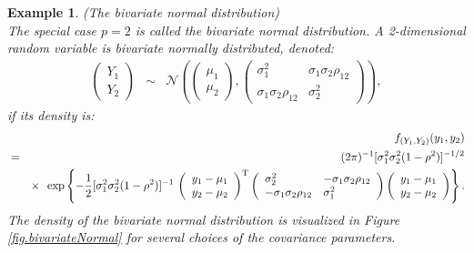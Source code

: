 \documentclass[a4paper]{article}
\theoremstyle{myexamplestyle}
\newtheorem{example}{Example}
\begin{document}
\begin{example} \textit{(The bivariate normal distribution)}
\\
The special case $p=2$ is called the bivariate normal distribution. A 2-dimensional random variable is bivariate normally distributed, denoted:
\begin{eqnarray*}
\left(
\begin{array}{l}
Y_{1}
\\
Y_{2}
\end{array}
\right)
& \sim &
\mathcal{N} \left(
\left(
\begin{array}{l}
\mu_{1}
\\
\mu_{2}
\end{array}
\right),
\left(
\begin{array}{ll}
\sigma_{1}^{2} & \sigma_1 \sigma_2 \rho_{12}
\\
\sigma_1 \sigma_2 \rho_{12} & \sigma_{2}^{2}
\end{array}
\right)
\right),
\end{eqnarray*}
if its density is:
\begin{eqnarray*}
& & \hspace{-1cm} f_{(Y_1, Y_2)} (y_1, y_2) 
\\
& = &
(2 \pi)^{-1} [\sigma_1^2 \sigma_2^2 (1-\rho^2)]^{-1/2} 
\\
& & \times \, \, \, \exp \left\{ -\frac{1}{2}
[\sigma_1^2 \sigma_2^2 (1-\rho^2)]^{-1}
\, 
\left(
\begin{array}{l}
y_{1} - \mu_1
\\
y_{2} - \mu_2
\end{array}
\right)^{\mathrm{T}} 
\left(
\begin{array}{ll}
\sigma_{2}^{2} & -\sigma_1 \sigma_2 \rho_{12}
\\
-\sigma_1 \sigma_2 \rho_{12} & \sigma_{1}^{2}
\end{array}
\right)
\left(
\begin{array}{l}
y_{1} - \mu_1
\\
y_{2} - \mu_2
\end{array}
\right) \right\}.
\end{eqnarray*}
The density of the bivariate normal distribution is visualized in Figure \ref{fig.bivariateNormal} for several choices of the covariance parameters.



\end{example}
\end{document}
